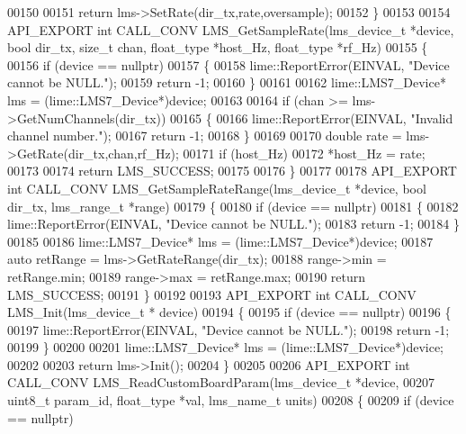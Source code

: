 \begin{DoxyCode}
00150 
00151     \textcolor{keywordflow}{return} lms->SetRate(dir\_tx,rate,oversample);
00152 \}
00153 
00154 API_EXPORT \textcolor{keywordtype}{int} CALL_CONV LMS_GetSampleRate(lms_device_t *device, \textcolor{keywordtype}{bool} dir_tx, \textcolor{keywordtype}{size\_t} 
      chan, float_type *host_Hz, float_type *rf_Hz)
00155 \{
00156     \textcolor{keywordflow}{if} (device == \textcolor{keyword}{nullptr})
00157     \{
00158         lime::ReportError(EINVAL, \textcolor{stringliteral}{"Device cannot be NULL."});
00159         \textcolor{keywordflow}{return} -1;
00160     \}
00161 
00162     lime::LMS7_Device* lms = (lime::LMS7_Device*)device;
00163 
00164     \textcolor{keywordflow}{if} (chan >= lms->GetNumChannels(dir\_tx))
00165     \{
00166         lime::ReportError(EINVAL, \textcolor{stringliteral}{"Invalid channel number."});
00167         \textcolor{keywordflow}{return} -1;
00168     \}
00169 
00170     \textcolor{keywordtype}{double} rate = lms->GetRate(dir\_tx,chan,rf\_Hz);
00171     \textcolor{keywordflow}{if} (host\_Hz)
00172         *host\_Hz = rate;
00173 
00174     \textcolor{keywordflow}{return} LMS_SUCCESS;
00175 
00176 \}
00177 
00178 API_EXPORT \textcolor{keywordtype}{int} CALL_CONV LMS_GetSampleRateRange(lms_device_t *device, \textcolor{keywordtype}{bool} 
      dir_tx, lms_range_t *range)
00179 \{
00180     \textcolor{keywordflow}{if} (device == \textcolor{keyword}{nullptr})
00181     \{
00182         lime::ReportError(EINVAL, \textcolor{stringliteral}{"Device cannot be NULL."});
00183         \textcolor{keywordflow}{return} -1;
00184     \}
00185 
00186     lime::LMS7_Device* lms = (lime::LMS7_Device*)device;
00187     \textcolor{keyword}{auto} retRange = lms->GetRateRange(dir\_tx);
00188     range->min = retRange.min;
00189     range->max = retRange.max;
00190     \textcolor{keywordflow}{return} LMS_SUCCESS;
00191 \}
00192 
00193 API_EXPORT \textcolor{keywordtype}{int} CALL_CONV LMS_Init(lms_device_t * device)
00194 \{
00195     \textcolor{keywordflow}{if} (device == \textcolor{keyword}{nullptr})
00196     \{
00197         lime::ReportError(EINVAL, \textcolor{stringliteral}{"Device cannot be NULL."});
00198         \textcolor{keywordflow}{return} -1;
00199     \}
00200 
00201     lime::LMS7_Device* lms = (lime::LMS7_Device*)device;
00202 
00203     \textcolor{keywordflow}{return} lms->Init();
00204 \}
00205 
00206 API_EXPORT \textcolor{keywordtype}{int} CALL_CONV LMS_ReadCustomBoardParam(lms_device_t *device,
00207                            uint8\_t param\_id, float_type *val, lms_name_t units)
00208 \{
00209     \textcolor{keywordflow}{if} (device == \textcolor{keyword}{nullptr})

\end{DoxyCode}
